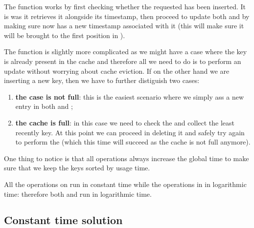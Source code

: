 The  function works by first checking whether the requested  has been inserted. It is was it retrieves it alongside its timestamp, then proceed to update both  and  by making sure now  has a new timestamp associated with it (this will make sure it will be brought to the first position in ).

The  function is slightly more complicated as we might have a case where the key is already present in the cache and therefore all we need to do is to perform an update without worrying about cache eviction.
If on the other hand we are inserting a new key, then we have to further distiguish two cases:
\begin{enumerate}
	\item \textbf{the case is not full}: this is the easiest scenario where we simply  ass a new entry in both  and ;
	\item \textbf{the cache is full}: in this case we need to check the  and collect the least recently key. At this point we can proceed in deleting it and safely try again to perform the  (which this time will succeed as the cache is not full anymore).
\end{enumerate}
One thing to notice is that all operations always increase the global time to make sure that we keep the keys sorted by usage time. 

All the operations on  run in constant time while the operations in  in logarithmic time: therefore both  and  run in logarithmic time.

\subsection{Constant time solution}
\label{LRU_cache:sec:constanttime}